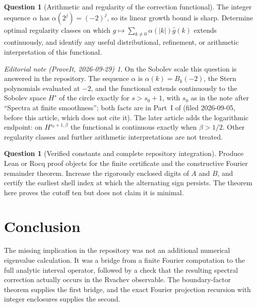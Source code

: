 \documentclass[11pt,a4paper]{article}
\theoremstyle{definition}
\newtheorem{question}[theorem]{Question}
\theoremstyle{remark}
\newtheorem*{ednote}{Editorial note (ProveIt, 2026-09-29)}
\numberwithin{equation}{section}
\begin{document}
\begin{question}[Arithmetic and regularity of the correction functional]
The integer sequence $\alpha$ has $\alpha(2^j)=(-2)^j$, so its linear growth
bound is sharp. Determine optimal regularity classes on which
$g\mapsto\sum_{k\ne0}\alpha(|k|)\widehat g(k)$ extends continuously,
and identify any useful distributional, refinement, or arithmetic
interpretation of this functional.
\end{question}
\begin{ednote}
On the Sobolev scale this question is answered in the repository. The
sequence $\alpha$ is $\alpha(k)=B_k(-2)$, the Stern polynomials evaluated
at $-2$, and the functional extends continuously to the Sobolev space $H^s$
of the circle exactly for $s>s_0+1$, with $s_0$ as in the note after
``Spectra at finite smoothness''; both facts are in Part~I of
 (filed 2026-09-05, before
this article, which does not cite it). The later article
 adds the
logarithmic endpoint: on $H^{s_0+1,\beta}$ the functional is continuous
exactly when $\beta>1/2$. Other regularity classes and further arithmetic
interpretations are not treated.
\end{ednote}

\begin{question}[Verified constants and complete repository integration]
Produce Lean or Rocq proof objects for the finite certificate and the
constructive Fourier remainder theorem. Increase the rigorously enclosed
digits of $A$ and $B$, and certify the earliest shell index at which the
alternating sign persists. The theorem here proves the cutoff ten but does
not claim it is minimal.
\end{question}

\section{Conclusion}
The missing implication in the repository was not an additional numerical
eigenvalue calculation. It was a bridge from a finite Fourier computation to
the full analytic interval operator, followed by a check that the resulting
spectral correction actually occurs in the Rvachev observable. The
boundary-factor theorem supplies the first bridge, and the exact Fourier
projection recursion with integer enclosures supplies the second.
\end{document}
